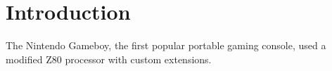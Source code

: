 \section{Introduction}

The Nintendo Gameboy, the first popular portable gaming console, used a modified Z80 processor with custom extensions. 

